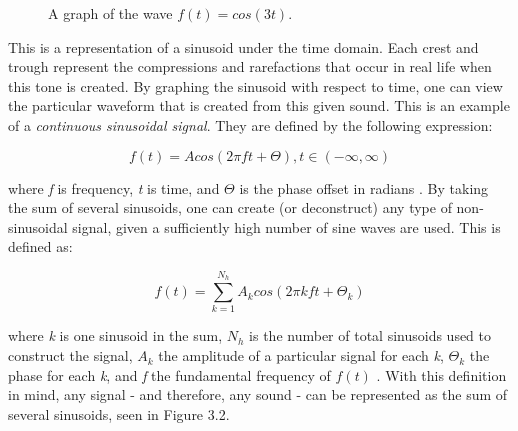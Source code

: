 \begin{figure}[h] %
\begin{center}
	\caption{A graph of the wave \(f(t) = cos(3t)\).}
\end{center}
\end{figure}

This is a representation of a sinusoid under the time domain. Each crest and trough represent the compressions and rarefactions that occur in real life when this tone is created. By graphing the sinusoid with respect to time, one can view the particular waveform that is created from this given sound. This is an example of a \textit{continuous sinusoidal signal}. They are defined by the following expression:

\begin{defn}\label{def1}
	\begin{equation}\label{introf(t)}
	f(t)=Acos(2\pi ft + \varTheta), t \in (-\infty, \infty)
\end{equation}\end{defn}

where \textit{f} is frequency, \textit{t} is time, and $\varTheta$ is the phase offset in radians \cite{Symons_2013}. By taking the sum of several sinusoids, one can create (or deconstruct) any type of non-sinusoidal signal, given a sufficiently high number of sine waves are used. This is defined as:

\begin{defn}\label{def2}
	\begin{equation}\label{intro2f(t)}
	f(t)=\sum_{k=1}^{N_h} A_k cos(2\pi kft + \varTheta_k)
\end{equation}\end{defn}

where \textit{k} is one sinusoid in the sum, $N_h$ is the number of total sinusoids used to construct the signal, $A_k$ the amplitude of a particular signal for each \textit{k}, $\varTheta_k$ the phase for each \textit{k}, and \textit{f} the fundamental frequency of $f(t)$ \cite{Symons_2013}. With this definition in mind, any signal - and therefore, any sound - can be represented as the sum of several sinusoids, seen in Figure 3.2.

